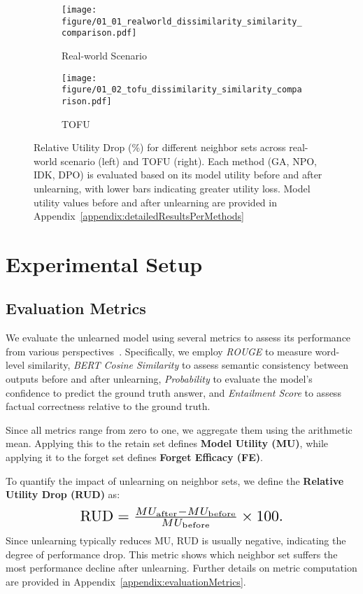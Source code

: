 \begin{figure*}[t]
    \centering
    \begin{subfigure}{0.49\linewidth}
        \texttt{[image: figure/01\_01\_realworld\_dissimilarity\_similarity\_comparison.pdf]}
        \caption{Real-world Scenario}
        \label{fig:real-world_main}
    \end{subfigure}
    \hfill
    \begin{subfigure}{0.49\linewidth}
    \label{fig:tofu_main}
        \texttt{[image: figure/01\_02\_tofu\_dissimilarity\_similarity\_comparison.pdf]}
        \caption{TOFU}
        \label{fig:tofu_main}
    \end{subfigure}
    \caption{Relative Utility Drop (\%) for different neighbor sets across real-world scenario (left) and TOFU (right). Each method (GA, NPO, IDK, DPO) is evaluated based on its model utility before and after unlearning, with lower bars indicating greater utility loss. Model utility values before and after unlearning are provided in Appendix~\ref{appendix:detailedResultsPerMethods}}
    \label{fig:experiment1}
\end{figure*}
\section{Experimental Setup}
\subsection{Evaluation Metrics}
We evaluate the unlearned model using several metrics to assess its performance from various perspectives~\citep{closerlookat, maini2024tofu}. Specifically, we employ \emph{ROUGE} to measure word-level similarity, \emph{BERT Cosine Similarity} to assess semantic consistency between outputs before and after unlearning, \emph{Probability} to evaluate the model's confidence to predict the ground truth answer, and \emph{Entailment Score} to assess factual correctness relative to the ground truth.

\noindent
Since all metrics range from zero to one, we aggregate them using the arithmetic mean. Applying this to the retain set defines \textbf{Model Utility (MU)}, while applying it to the forget set defines \textbf{Forget Efficacy (FE)}.

\noindent
To quantify the impact of unlearning on neighbor sets, we define the \textbf{Relative Utility Drop (RUD)} as:
\begin{equation}
\resizebox{0.6\hsize}{!}{$
\textstyle \text{RUD} = \frac{MU_{\text{after}} - MU_{\text{before}}}{MU_{\text{before}}} \times 100.$}
\end{equation}
Since unlearning typically reduces MU, RUD is usually negative, indicating the degree of performance drop. This metric shows which neighbor set suffers the most performance decline after unlearning. Further details on metric computation are provided in Appendix~\ref{appendix:evaluationMetrics}.
